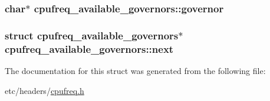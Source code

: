 \subsubsection[{\texorpdfstring{governor}{governor}}]{\setlength{\rightskip}{0pt plus 5cm}char$\ast$ cpufreq\+\_\+available\+\_\+governors\+::governor}\hypertarget{structcpufreq__available__governors_addce0fc786b4df6bd024fb58c7466d64}{}\label{structcpufreq__available__governors_addce0fc786b4df6bd024fb58c7466d64}
\subsubsection[{\texorpdfstring{next}{next}}]{\setlength{\rightskip}{0pt plus 5cm}struct {\bf cpufreq\+\_\+available\+\_\+governors}$\ast$ cpufreq\+\_\+available\+\_\+governors\+::next}\hypertarget{structcpufreq__available__governors_a93d6af680621259a45cca02a509de44d}{}\label{structcpufreq__available__governors_a93d6af680621259a45cca02a509de44d}


The documentation for this struct was generated from the following file\+:\begin{DoxyCompactItemize}
\item 
etc/headers/\hyperlink{cpufreq_8h}{cpufreq.\+h}\end{DoxyCompactItemize}
